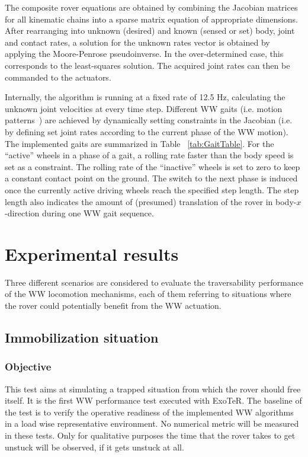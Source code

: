\documentclass[a4paper,twocolumn]{esapub2005} %
\begin{document}
The composite rover equations are obtained by combining the Jacobian
matrices for all kinematic chains into a sparse matrix equation of appropriate
dimensions. After rearranging into unknown (desired) and known (sensed or set) 
body, joint and contact rates, a solution for the unknown rates vector is 
obtained by applying the Moore-Penrose pseudoinverse. In the over-determined 
case, this corresponds to the least-squares solution. The acquired joint rates 
can then be commanded to the actuators.

Internally, the algorithm is running at a fixed rate of 12.5 Hz, calculating 
the unknown joint velocities at every time step. Different WW gaits (i.e. 
motion patterns~\cite{LucWalkingGaits}) are achieved by dynamically setting 
constraints in the Jacobian (i.e. by defining set joint rates according to the 
current phase of the WW motion). The implemented gaits are summarized in Table 
~\ref{tab:GaitTable}. For the ``active'' wheels in a phase of a gait, a rolling 
rate faster than the body speed is set as a constraint. The rolling rate of the 
``inactive'' wheels is set to zero to keep a constant contact point on the 
ground. The switch to the next phase is induced once the currently active 
driving wheels reach the specified step length. The step length also indicates 
the amount of (presumed) translation of the rover in body-$x$-direction during 
one WW gait sequence.


\section{Experimental results}

Three different scenarios are considered to evaluate the traversability
performance of the WW locomotion mechanisms, each of them referring
to situations where the rover could potentially benefit from the WW
actuation.

\subsection{Immobilization situation} 

\subsubsection{Objective} This test aims at simulating a trapped situation from
which the rover should free itself. It is the first WW performance test
executed with ExoTeR. The baseline of the test is to verify the operative
readiness of the implemented WW algorithms in a load wise representative
environment.  No numerical metric will be measured in these tests. Only for
qualitative purposes the time that the rover takes to get unstuck will be
observed, if it gets unstuck at all.
\end{document}
